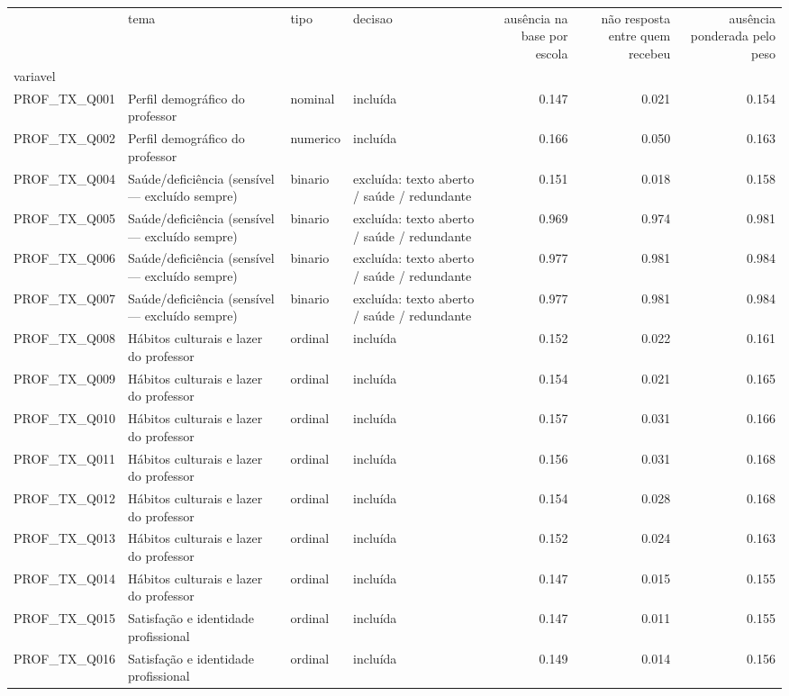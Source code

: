 \begin{tabular}{llllrrr}
\toprule
 & tema & tipo & decisao & ausência na base por escola & não resposta entre quem recebeu & ausência ponderada pelo peso \\
variavel &  &  &  &  &  &  \\
\midrule
PROF\_TX\_Q001 & Perfil demográfico do professor & nominal & incluída & 0.147 & 0.021 & 0.154 \\
PROF\_TX\_Q002 & Perfil demográfico do professor & numerico & incluída & 0.166 & 0.050 & 0.163 \\
PROF\_TX\_Q004 & Saúde/deficiência (sensível — excluído sempre) & binario & excluída: texto aberto / saúde / redundante & 0.151 & 0.018 & 0.158 \\
PROF\_TX\_Q005 & Saúde/deficiência (sensível — excluído sempre) & binario & excluída: texto aberto / saúde / redundante & 0.969 & 0.974 & 0.981 \\
PROF\_TX\_Q006 & Saúde/deficiência (sensível — excluído sempre) & binario & excluída: texto aberto / saúde / redundante & 0.977 & 0.981 & 0.984 \\
PROF\_TX\_Q007 & Saúde/deficiência (sensível — excluído sempre) & binario & excluída: texto aberto / saúde / redundante & 0.977 & 0.981 & 0.984 \\
PROF\_TX\_Q008 & Hábitos culturais e lazer do professor & ordinal & incluída & 0.152 & 0.022 & 0.161 \\
PROF\_TX\_Q009 & Hábitos culturais e lazer do professor & ordinal & incluída & 0.154 & 0.021 & 0.165 \\
PROF\_TX\_Q010 & Hábitos culturais e lazer do professor & ordinal & incluída & 0.157 & 0.031 & 0.166 \\
PROF\_TX\_Q011 & Hábitos culturais e lazer do professor & ordinal & incluída & 0.156 & 0.031 & 0.168 \\
PROF\_TX\_Q012 & Hábitos culturais e lazer do professor & ordinal & incluída & 0.154 & 0.028 & 0.168 \\
PROF\_TX\_Q013 & Hábitos culturais e lazer do professor & ordinal & incluída & 0.152 & 0.024 & 0.163 \\
PROF\_TX\_Q014 & Hábitos culturais e lazer do professor & ordinal & incluída & 0.147 & 0.015 & 0.155 \\
PROF\_TX\_Q015 & Satisfação e identidade profissional & ordinal & incluída & 0.147 & 0.011 & 0.155 \\
PROF\_TX\_Q016 & Satisfação e identidade profissional & ordinal & incluída & 0.149 & 0.014 & 0.156 \\

\end{tabular}
